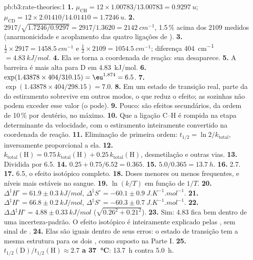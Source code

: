 \begin{solution}{pb:b3:rate-theories:1}
\textbf{1.} $\mu_{\mathrm{CH}} = 12 \times 1.00783/13.00783 = \qty{0.9297}{u}$; $\mu_{\mathrm{CD}} = 12 \times 2.01410/14.01410 =
\qty{1.7246}{u}$.
\textbf{2.} $2917/\sqrt{1.7246/0.9297} = 2917/1.3620 = \qty{2142}{cm^{-1}}$, 1.5\,\% acima dos
2109 medidos (anarmonicidade e acoplamento das quatro ligações de ).
\textbf{3.} $\frac12 \times 2917 = \qty{1458.5}{cm^{-1}}$ e $\frac12 \times 2109 = \qty{1054.5}{cm^{-1}}$; diferença
\qty{404}{cm^{-1}} $= \qty{4.83}{kJ/mol}$.
\textbf{4.} Ela se torna a coordenada de reação: sua  desaparece.
\textbf{5.} A barreira é mais alta para D em \qty{4.83}{kJ/mol}.
\textbf{6.} $\exp(1.43878 \times 404/310.15) = \eu^{1.874} = 6.5$.
\textbf{7.} $\exp(1.43878 \times 404/298.15) = 7.0$.
\textbf{8.} Em um estado de transição real, parte da  do
estiramento sobrevive em outros modos, o que reduz o efeito; as  sozinhas não podem exceder esse valor (o  pode).
\textbf{9.} Pouco: são efeitos secundários, da ordem de 10\,\% por deutério, no
máximo.
\textbf{10.} Que a ligação C--H é rompida na etapa determinante da velocidade, com o
estiramento inteiramente convertido na coordenada de reação.
\textbf{11.} Eliminação de primeira ordem: $t_{1/2} = \ln2/k_{\mathrm{total}}$, inversamente proporcional a ela.
\textbf{12.} $k_{\mathrm{total}}(\mathrm H) = 0.75\,k_{\mathrm{total}}(\mathrm H) + 0.25\,k_{\mathrm{total}}(\mathrm H)$, desmetilação e outras vias.
\textbf{13.} Dividida por 6.5.
\textbf{14.} $0.25 + 0.75/6.52 = 0.365$.
\textbf{15.} $5.0/0.365 = \qty{13.7}{h}$.
\textbf{16.} 2.7.
\textbf{17.} 6.5, o efeito isotópico completo.
\textbf{18.} Doses menores ou menos frequentes, e níveis mais estáveis no sangue.
\textbf{19.} $\ln(k/T)$ em função de $1/T$.
\textbf{20.} $\Delta^{\ddagger}H^\circ = 61.9 \pm \qty{0.3}{kJ/mol}$, $\Delta^{\ddagger}S^\circ = -60.1 \pm \qty{0.9}{J.K^{-1}.mol^{-1}}$.
\textbf{21.} $\Delta^{\ddagger}H^\circ = 66.8 \pm \qty{0.2}{kJ/mol}$, $\Delta^{\ddagger}S^\circ = -60.3 \pm \qty{0.7}{J.K^{-1}.mol^{-1}}$.
\textbf{22.} $\Delta\Delta^{\ddagger}H^\circ = 4.88 \pm \qty{0.33}{kJ/mol}$ ($\sqrt{0.26^2 + 0.21^2}$).
\textbf{23.} Sim: 4.83 fica bem dentro de uma incerteza-padrão. O efeito isotópico é
inteiramente explicado pelas , sem sinal de .
\textbf{24.} Elas são iguais dentro de seus erros: o estado de transição tem a mesma
estrutura para os dois , como suposto na Parte I.
\textbf{25.} \textbf{$t_{1/2}(\mathrm D)/t_{1/2}(\mathrm H) \approx 2.7$ a \qty{37}{\celsius}}: \qty{13.7}{h} contra \qty{5.0}{h}.
\end{solution}
